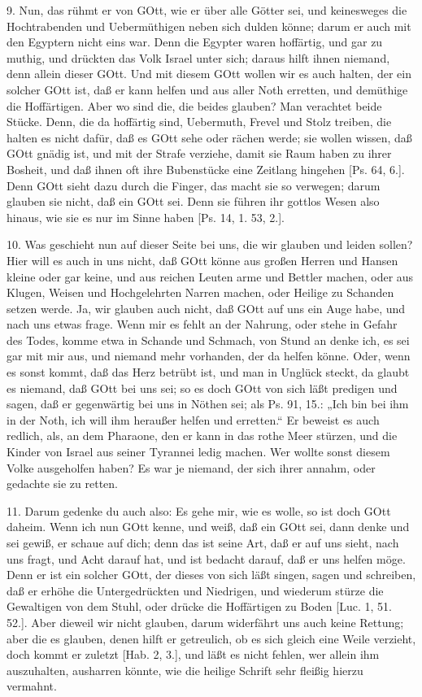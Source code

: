 9. Nun, das rühmt er von GOtt, wie er über alle Götter sei, und keinesweges die Hochtrabenden und Uebermüthigen neben sich dulden könne; darum er auch mit den Egyptern nicht eins war. Denn die Egypter waren hoffärtig, und gar zu muthig, und drückten das Volk Israel unter sich; daraus hilft ihnen niemand, denn allein dieser GOtt. Und mit diesem GOtt wollen wir es auch halten, der ein solcher GOtt ist, daß er kann helfen und aus aller Noth erretten, und demüthige die Hoffärtigen. Aber wo sind die, die beides glauben? Man verachtet beide Stücke. Denn, die da hoffärtig sind, Uebermuth, Frevel und Stolz treiben, die halten es nicht dafür, daß es GOtt sehe oder rächen werde; sie wollen wissen, daß GOtt gnädig ist, und mit der Strafe verziehe, damit sie Raum haben zu ihrer Bosheit, und daß ihnen oft ihre Bubenstücke eine Zeitlang hingehen [Ps. 64, 6.]. Denn GOtt sieht dazu durch die Finger, das macht sie so verwegen; darum glauben sie nicht, daß ein GOtt sei. Denn sie führen ihr gottlos Wesen also hinaus, wie sie es nur im Sinne haben [Ps. 14, 1. 53, 2.].

10. Was geschieht nun auf dieser Seite bei uns, die wir glauben und leiden sollen? Hier will es auch in uns nicht, daß GOtt könne aus großen Herren und Hansen kleine oder gar keine, und aus reichen Leuten arme und Bettler machen, oder aus Klugen, Weisen und Hochgelehrten Narren machen, oder Heilige zu Schanden setzen werde. Ja, wir glauben auch nicht, daß GOtt auf uns ein Auge habe, und nach uns etwas frage. Wenn mir es fehlt an der Nahrung, oder stehe in Gefahr des Todes, komme etwa in Schande und Schmach, von Stund an denke ich, es sei gar mit mir aus, und niemand mehr vorhanden, der da helfen könne. Oder, wenn es sonst kommt, daß das Herz betrübt ist, und man in Unglück steckt, da glaubt es niemand, daß GOtt bei uns sei; so es doch GOtt von sich läßt predigen und sagen, daß er gegenwärtig bei uns in Nöthen sei; als Ps. 91, 15.: „Ich
bin bei ihm in der Noth, ich will ihm heraußer helfen und erretten.“ Er beweist es auch redlich, als, an dem Pharaone, den er kann in das rothe Meer stürzen, und die Kinder von Israel aus seiner Tyrannei ledig machen. Wer wollte sonst diesem Volke ausgeholfen haben? Es war je niemand, der sich ihrer annahm, oder gedachte sie zu retten.

11. Darum gedenke du auch also: Es gehe mir, wie es wolle, so ist doch GOtt daheim. Wenn ich nun GOtt kenne, und weiß, daß ein GOtt sei, dann denke und sei gewiß, er schaue auf dich; denn das ist seine Art, daß er auf uns sieht, nach uns fragt, und Acht darauf hat, und ist bedacht darauf, daß er uns helfen möge. Denn er ist ein solcher GOtt, der dieses von sich läßt singen, sagen und schreiben, daß er erhöhe die Untergedrückten und Niedrigen, und wiederum stürze die Gewaltigen von dem Stuhl, oder drücke die Hoffärtigen zu Boden [Luc. 1, 51. 52.]. Aber dieweil wir nicht glauben, darum widerfährt uns auch keine Rettung; aber die es glauben, denen hilft er getreulich, ob es sich gleich eine Weile verzieht, doch kommt er zuletzt [Hab. 2, 3.], und läßt es nicht fehlen, wer allein ihm auszuhalten, ausharren könnte, wie die heilige Schrift sehr fleißig hierzu vermahnt.

